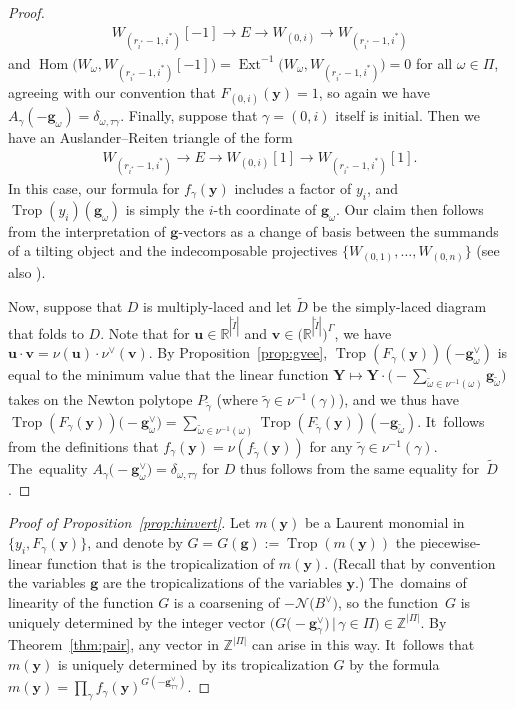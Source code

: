 \documentclass[pdftex]{sigma}%
\def\R{{\mathbb R}}
\def\Z{{\mathbb Z}}
\def\u{{\mathbf{u}}}
\def\Hom{\operatorname{Hom}}
\def\Ext{\operatorname{Ext}}
\def\tD{{\tilde D}}
\def\tI{{\tilde I}}
\def\y{{\mathbf y}}
\def\v{{\mathbf v}}
\def\N{{\mathcal{N}}}
\def\Trop{\operatorname{Trop}}
\def\g{{\mathbf g}}
\def\Y{{\mathbf Y}}
\def\tomega{{\tilde \omega}}
\def\tgamma{{\tilde \gamma}}
\numberwithin{equation}{section}
\begin{document}
\begin{proof}
\begin{gather*}
W_{(r_{i^*}-1,i^*)}[-1] \to E \to W_{(0,i)} \to W_{(r_{i^*}-1,i^*)}
\end{gather*}
and $\Hom\big(W_\omega,W_{(r_{i^*}-1,i^*)}[-1]\big)= \Ext^{-1}\big(W_\omega,W_{(r_{i^*}-1,i^*)}\big) = 0$ for all $\omega \in \Pi$, agreeing with our convention that $F_{(0,i)}(\y) = 1$, so again we have $A_\gamma(-\g_\omega) = \delta_{\omega, \tau \gamma}$. Finally, suppose that $\gamma = (0,i)$ itself is initial. Then we have an Auslander--Reiten triangle of the form
\begin{gather*}
W_{(r_{i^*}-1,i^*)} \to E \to W_{(0,i)}[1] \to W_{(r_{i^*}-1,i^*)} [1].
\end{gather*}
In this case, our formula for $f_\gamma(\y)$ includes a factor of $y_i$, and $\Trop(y_i)(\g_\omega)$ is simply the $i$-th coordinate of $\g_\omega$. Our claim then follows from the interpretation \cite[Section~6]{BDMTY} of $\g$-vectors as a change of basis between the summands of a tilting object and the indecomposable projectives $\big\{W_{(0,1)},\dots,W_{(0,n)}\big\}$ (see also \cite[Theorem~3.23(ii)]{PPPP}).

Now, suppose that $D$ is multiply-laced and let $\tD$ be the simply-laced diagram that folds to $D$. Note that for $\u \in \R^{|\tI|}$ and $\v \in \big(\R^{|\tI|}\big)^\Gamma$, we have $\u \cdot \v = \nu(\u) \cdot \nu^\vee(\v)$.
By Proposition~\ref{prop:gvee}, $\Trop(F_\gamma(\y))(-\g^\vee_\omega)$ is equal to the minimum value that the linear function $\Y \mapsto \Y \cdot \big({-}\sum_{\tomega \in \nu^{-1}(\omega)}\g_\tomega\big)$ takes on the Newton polytope $P_{\tgamma}$ (where $\tgamma \in \nu^{-1}(\gamma)$), and we thus have $\Trop(F_\gamma(\y))\big({-}\g^\vee_\omega\big) = \sum_{\tomega \in \nu^{-1}(\omega)} \Trop(F_\tgamma(\y))(-\g_\tomega)$. It~follows from the definitions that $f_\gamma(\y) = \nu(f_{\tgamma}(\y))$ for any $\tgamma \in \nu^{-1}(\gamma)$. The~equality $A_\gamma\big({-}\g^\vee_\omega\big) = \delta_{\omega, \tau \gamma}$ for $D$ thus follows from the same equality for~$\tD$.
\end{proof}

\begin{proof}[Proof of Proposition~\ref{prop:hinvert}]
Let $m(\y)$ be a Laurent monomial in $\{y_i, F_\gamma(\y)\}$, and denote by $G=G(\g):=\Trop(m(\y))$ the piecewise-linear function that is the tropicalization of $m(\y)$. (Recall that by convention the variables $\g$ are the tropicalizations of the variables $\y$.)
The~domains of linearity of the function $G$ is a coarsening of $-\N\big(B^\vee\big)$, so the function~$G$ is uniquely determined by the integer vector $\big(G\big({-}\g^\vee_\gamma\big) \,|\, \gamma \in \Pi\big) \in \Z^{|\Pi|}$. By Theorem~\ref{thm:pair}, any vector in $\Z^{|\Pi|}$ can arise in this way. It~follows that $m(\y)$ is uniquely determined by its tropicalization $G$ by the formula $m(\y) = \prod_\gamma f_\gamma(\y)^{G(-\g^\vee_{\tau \gamma})}$.
\end{proof}
\end{document}
